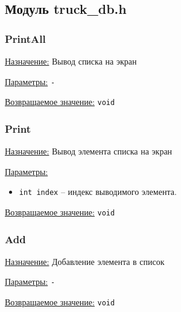 \subsection*{Модуль truck\_db.h}


\subsubsection*{PrintAll}

\underline{Назначение:} Вывод списка на экран

\underline{Параметры:} \verb|-|

\underline{Возвращаемое значение:} \verb|void|


\subsubsection*{Print}

\underline{Назначение:} Вывод элемента списка на экран

\underline{Параметры:} 

\begin{itemize}
    \item \verb|int index| -- индекс выводимого элемента.
\end{itemize}

\underline{Возвращаемое значение:} \verb|void|

\begin{comment}
\subsubsection*{Edit}

\underline{Назначение:} Редактирование элемента базы данных

\underline{Параметры:} \verb|int index|

\underline{Возвращаемое значение:} \verb|void|
\end{comment}


\subsubsection*{Add}

\underline{Назначение:} Добавление элемента в список

\underline{Параметры:} \verb|-|

\underline{Возвращаемое значение:} \verb|void|

\begin{comment}
\subsubsection*{Delete}

\underline{Назначение:} Удаление элемента из списка

\underline{Параметры:} \verb|int index|

\underline{Возвращаемое значение:} \verb|void|
\end{comment}


